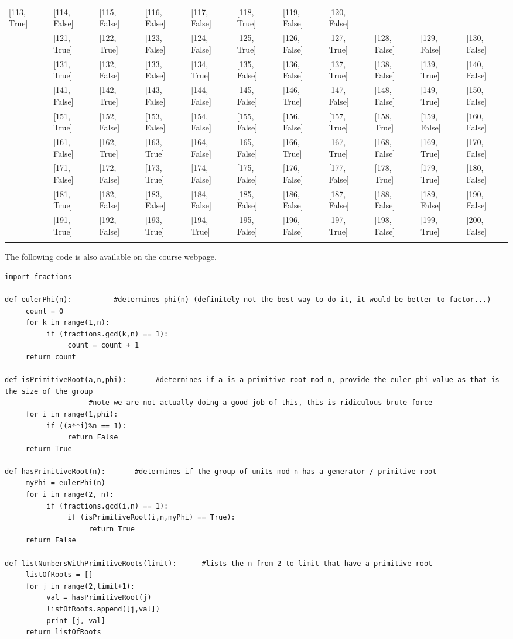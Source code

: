 \documentclass[11pt]{amsart}
\begin{document}
{\begin{tabular}{lllllllllll}
[113, True] &
[114, False] &
[115, False] &
[116, False] &
[117, False] &
[118, True] &
[119, False] &
[120, False] \\ &
[121, True] &
[122, True] &
[123, False] &
[124, False] &
[125, True] &
[126, False] &
[127, True] &
[128, False] &
[129, False] &
[130, False] \\ &
[131, True] &
[132, False] &
[133, False] &
[134, True] &
[135, False] &
[136, False] &
[137, True] &
[138, False] &
[139, True] &
[140, False] \\ &
[141, False] &
[142, True] &
[143, False] &
[144, False] &
[145, False] &
[146, True] &
[147, False] &
[148, False] &
[149, True] &
[150, False] \\ &
[151, True] &
[152, False] &
[153, False] &
[154, False] &
[155, False] &
[156, False] &
[157, True] &
[158, True] &
[159, False] &
[160, False] \\ &
[161, False] &
[162, True] &
[163, True] &
[164, False] &
[165, False] &
[166, True] &
[167, True] &
[168, False] &
[169, True] &
[170, False] \\ &
[171, False] &
[172, False] &
[173, True] &
[174, False] &
[175, False] &
[176, False] &
[177, False] &
[178, True] &
[179, True] &
[180, False] \\ &
[181, True] &
[182, False] &
[183, False] &
[184, False] &
[185, False] &
[186, False] &
[187, False] &
[188, False] &
[189, False] &
[190, False] \\ &
[191, True] &
[192, False] &
[193, True] &
[194, True] &
[195, False] &
[196, False] &
[197, True] &
[198, False] &
[199, True] &
[200, False] \\ &
\end{tabular}
}
The following code is also available on the course webpage.
{\scriptsize
\begin{verbatim}
import fractions

def eulerPhi(n):          #determines phi(n) (definitely not the best way to do it, it would be better to factor...)
     count = 0
     for k in range(1,n):
          if (fractions.gcd(k,n) == 1):
               count = count + 1
     return count

def isPrimitiveRoot(a,n,phi):       #determines if a is a primitive root mod n, provide the euler phi value as that is the size of the group
                    #note we are not actually doing a good job of this, this is ridiculous brute force
     for i in range(1,phi):
          if ((a**i)%n == 1):
               return False
     return True

def hasPrimitiveRoot(n):       #determines if the group of units mod n has a generator / primitive root
     myPhi = eulerPhi(n)
     for i in range(2, n):
          if (fractions.gcd(i,n) == 1):
               if (isPrimitiveRoot(i,n,myPhi) == True):
                    return True
     return False

def listNumbersWithPrimitiveRoots(limit):      #lists the n from 2 to limit that have a primitive root
     listOfRoots = []
     for j in range(2,limit+1):
          val = hasPrimitiveRoot(j)
          listOfRoots.append([j,val])
          print [j, val]
     return listOfRoots
\end{verbatim}
}
\end{document}
